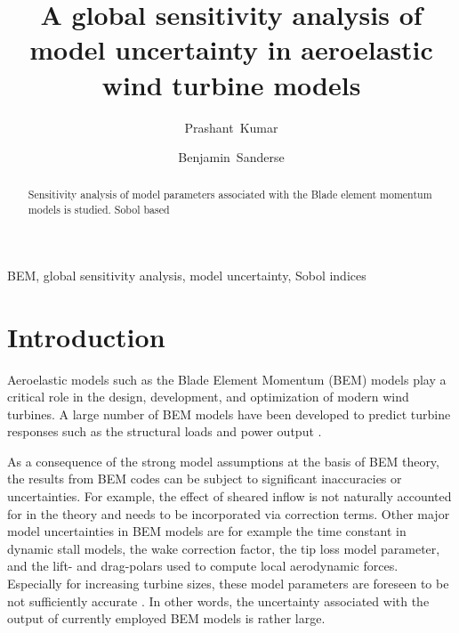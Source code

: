 \documentclass[review]{elsarticle}
\numberwithin{equation}{section}
\numberwithin{equation}{section}
\begin{document}
\begin{frontmatter}
\title{A global sensitivity analysis of model uncertainty in aeroelastic wind turbine models}

\address[cwi]{Centrum Wiskunde \& Informatica (CWI), Amsterdam, The Netherlands}
\author[]{Prashant~Kumar}

\author{Benjamin~Sanderse}

\begin{abstract}
Sensitivity analysis of model parameters associated with the Blade element momentum models is studied. Sobol based 
\end{abstract}
\begin{keyword}
BEM, global sensitivity analysis, model uncertainty, Sobol indices
\end{keyword}
\end{frontmatter}

\linenumbers

\section{Introduction}
Aeroelastic models such as the Blade Element Momentum (BEM) models \cite{HandBook} play a critical role in the design, development, and optimization of modern wind turbines. A large number of BEM models have been developed to predict turbine responses such as the structural loads and power output \cite{Vorpahl2013}. 

As a consequence of the strong model assumptions at the basis of BEM theory, the results from BEM codes can be subject to significant inaccuracies or uncertainties. For example, the effect of sheared inflow \cite{Madsen2012} is not naturally accounted for in the theory and needs to be incorporated via correction terms. Other major model uncertainties in BEM models are for example the time constant in dynamic stall models, the wake correction factor, the tip loss model parameter, and the lift- and drag-polars used to compute local aerodynamic forces. Especially for increasing turbine sizes, these model parameters are foreseen to be not sufficiently accurate \cite{Sayed2019}. In other words, the uncertainty associated with the output of currently employed BEM models is rather large. 
\end{document}
